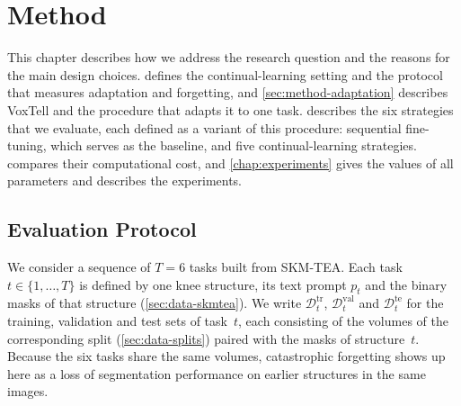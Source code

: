 %

\chapter{Method}
\label{chap:method}

This chapter describes how we address the research question and the reasons for the main design choices.
 defines the continual-learning setting and the protocol that measures adaptation and forgetting, and \cref{sec:method-adaptation} describes VoxTell and the procedure that adapts it to one task.
 describes the six strategies that we evaluate, each defined as a variant of this procedure: sequential fine-tuning, which serves as the baseline, and five continual-learning strategies.
 compares their computational cost, and \cref{chap:experiments} gives the values of all parameters and describes the experiments.

\section{Evaluation Protocol}
\label{sec:method-setting-protocol}

We consider a sequence of $T = 6$ tasks built from SKM-TEA.
Each task $t \in \{1, \dots, T\}$ is defined by one knee structure, its text prompt $p_t$ and the binary masks of that structure (\cref{sec:data-skmtea}).
We write $\mathcal{D}_t^{\mathrm{tr}}$, $\mathcal{D}_t^{\mathrm{val}}$ and $\mathcal{D}_t^{\mathrm{te}}$ for the training, validation and test sets of task~$t$, each consisting of the volumes of the corresponding split (\cref{sec:data-splits}) paired with the masks of structure~$t$.
Because the six tasks share the same volumes, catastrophic forgetting shows up here as a loss of segmentation performance on earlier structures in the same images.

